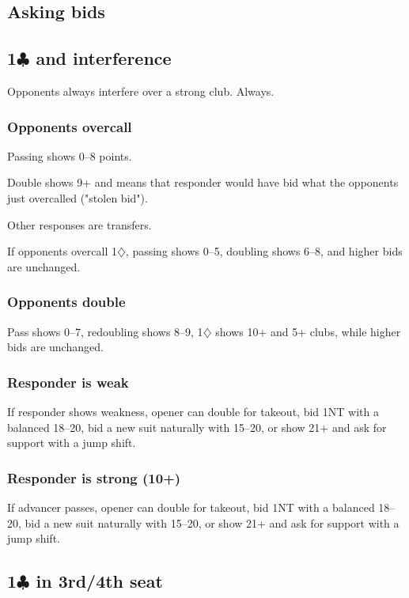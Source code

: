 \documentclass[a4paper, twoside, 11pt]{article}
\begin{document}
\begin{multicols}{3}
 \subsection*{Asking bids}

 \subsection*{1$\clubsuit$ and interference}
 Opponents always interfere over a strong club. Always.

 \subsubsection*{Opponents overcall}
Passing shows 0--8 points.

Double shows 9+ and means that responder would have bid what the opponents just overcalled ("stolen bid").

Other responses are transfers.

If opponents overcall 1$\diamondsuit$, passing shows 0--5, doubling shows 6--8, and higher bids are unchanged.

\subsubsection*{Opponents double}
Pass shows 0--7, redoubling shows 8--9, 1$\diamondsuit$ shows 10+ and 5+ clubs, while higher bids are unchanged.

\subsubsection*{Responder is weak}
If responder shows weakness, opener can double for takeout, bid 1NT with a balanced 18--20, bid a new suit naturally with 15--20, or show 21+ and ask for support with a jump shift.

\subsubsection*{Responder is strong (10+)}
If advancer passes, opener can double for takeout, bid 1NT with a balanced 18--20, bid a new suit naturally with 15--20, or show 21+ and ask for support with a jump shift.






 \subsection*{1$\clubsuit$ in 3rd/4th seat}






\end{multicols}
\end{document}
